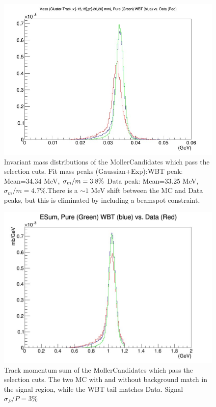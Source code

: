 \documentclass{article}
\begin{document}
\begin{figure}[H]
  	\includegraphics[width=\linewidth]{MollerPlots/massWithMatching}
  	\caption{Invariant mass distributions of the MollerCandidates which pass the selection cuts. \newline\newline Fit mass peaks (Gaussian+Exp):\newline WBT peak: Mean=34.34 MeV,  $\sigma_m/m = 3.8\%\newline$ Data peak: Mean=33.25 MeV, $\sigma_m/m = 4.7\%$.\newline\newline There is a $\sim1$ MeV shift between the MC and Data peaks, but this is eliminated by including a beamspot constraint.}
  	\label{fig:massCut1}
	\end{figure}

\begin{figure}[H]
  	\includegraphics[width=\linewidth]{MollerPlots/TrackESum}
  	\caption{Track momentum sum of the MollerCandidates which pass the selection cuts. The two MC with and without background match in the signal region, while the WBT tail matches Data. Signal $\sigma_P/P = 3\%$}
  	\label{fig:CutMomSum}
	\end{figure}
\end{document}
